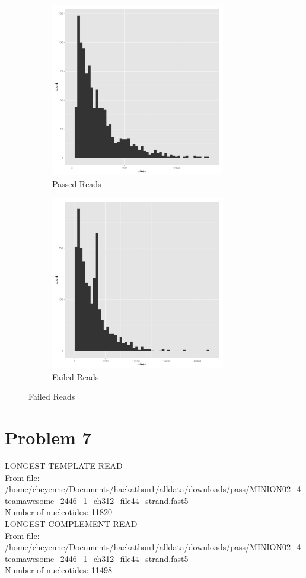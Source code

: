 \documentclass[11pt]{article}
\begin{document}
        \begin{figure}[h!]
		\begin{subfigure}[b]{0.45\textwidth}
    			\includegraphics[width=3in]{histallpass}
    			\caption{Passed Reads}
  		\end{subfigure}
  		\begin{subfigure}[b]{0.45\textwidth}
    			\includegraphics[width=3in]{histallfail}
    			\caption{Failed Reads}
  		\end{subfigure}
	\end{figure}
\section*{Problem 7}

LONGEST TEMPLATE READ\\
From file: /home/cheyenne/Documents/hackathon1/alldata/downloads/pass/MINION02\_4teamawesome\_2446\_1\_ch312\_file44\_strand.fast5\\
Number of nucleotides: 11820\\

LONGEST COMPLEMENT READ\\
From file: /home/cheyenne/Documents/hackathon1/alldata/downloads/pass/MINION02\_4teamawesome\_2446\_1\_ch312\_file44\_strand.fast5\\
Number of nucleotides: 11498\\
\end{document}
